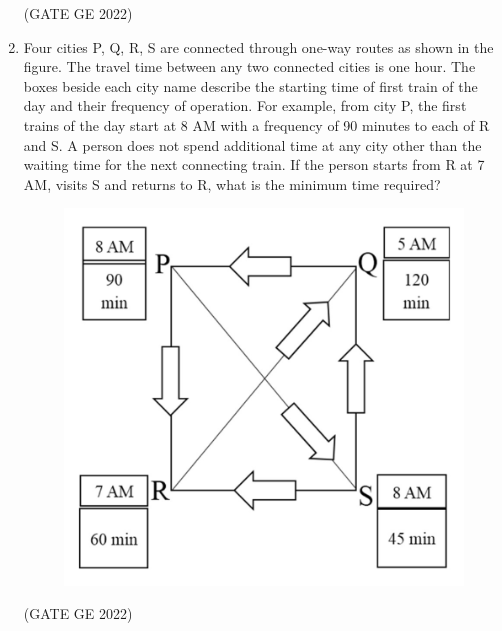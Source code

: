 \documentclass[journal,12pt,onecolumn]{IEEEtran}
\theoremstyle{remark}
\begin{document}
\begin{enumerate}
\hfill (GATE GE 2022)

\begin{enumerate}
\end{enumerate}

\item Four cities P, Q, R, S are connected through one-way routes as shown in the figure. The travel time between any two connected cities is one hour. The boxes beside each city name describe the starting time of first train of the day and their frequency of operation. For example, from city P, the first trains of the day start at 8 AM with a frequency of 90 minutes to each of R and S. A person does not spend additional time at any city other than the waiting time for the next connecting train.
If the person starts from R at 7 AM, visits S and returns to R, what is the minimum time required?
\begin{figure}[H]
    \centering
    \includegraphics[width=0.4\columnwidth]{figs/fig_9.png}
    \label{fig:placeholder}
\end{figure}

\hfill (GATE GE 2022)

\begin{enumerate}
\end{enumerate}


\end{enumerate}
\end{document}
